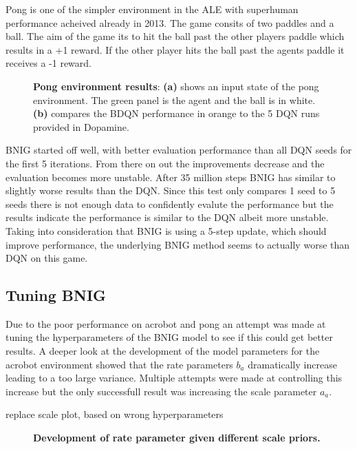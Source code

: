 Pong is one of the simpler environment in the ALE with superhuman performance acheived already in 2013\citep{mnih_2013}. The game consits of two paddles and a ball. The aim of the game its to hit the ball past the other players paddle which results in a +1 reward. If the other player hits the ball past the agents paddle it receives a -1 reward. 

\begin{figure}[H]
    \caption{\textbf{Pong environment results}: \textbf{(a)} shows an input state of the pong environment\citep{gym_docs}. The green panel is the agent and the ball is in white. \textbf{(b)} compares the BDQN performance in orange to the 5 DQN runs provided in Dopamine.}
    \label{fig:nn_pong}
\end{figure}

BNIG started off well, with better evaluation performance than all DQN seeds for the first 5 iterations. From there on out the improvements decrease and the evaluation becomes more unstable. After 35 million steps BNIG has similar to slightly worse results than the DQN. Since this test only compares 1 seed to 5 seeds there is not enough data to confidently evalute the performance but the results indicate the performance is similar to the DQN albeit more unstable. Taking into consideration that BNIG is using a 5-step update, which should improve performance, the underlying BNIG method seems to actually worse than DQN on this game.

\subsection{Tuning BNIG}

Due to the poor performance on acrobot and pong an attempt was made at tuning the hyperparameters of the BNIG model to see if this could get better results. A deeper look at the development of the model parameters for the acrobot environment showed that the rate parameters $b_a$ dramatically increase leading to a too large variance. Multiple attempts were made at controlling this increase but the only successfull result was increasing the scale parameter $a_a$.


\todo replace scale plot, based on wrong hyperparameters
\begin{figure}[H]
    \centering
    \caption{\textbf{Development of rate parameter given different scale priors.}}
    \label{fig:scale_stability}
\end{figure}

